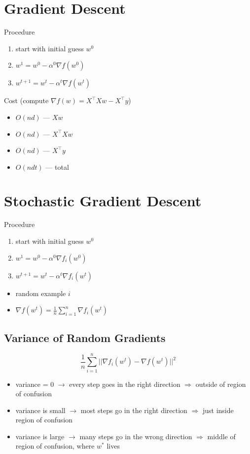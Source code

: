 \documentclass[10pt,landscape,a4paper]{article}
\begin{document}
\begin{multicols*}{5}
\section{Gradient Descent}
Procedure
\begin{enumerate}
    \item start with initial guess \(w^0\)
    \item \(w^1 = w^0 - \alpha^0 \nabla f(w^0)\)
    \item \(w^{t+1} = w^t - \alpha^t \nabla f(w^t)\)
\end{enumerate}
Cost (compute \(\nabla f(w) = X^\intercal Xw - X^\intercal y\))
\begin{itemize}
    \item \(O(nd)\) --- \(Xw\)
    \item \(O(nd)\) --- \(X^\intercal Xw\)
    \item \(O(nd)\) --- \(X^\intercal y\)
    \item \(O(ndt)\) --- total
\end{itemize}

\section{Stochastic Gradient Descent}
Procedure
\begin{enumerate}
    \item start with initial guess \(w^0\)
    \item \(w^1  = w^0 - \alpha^0 \nabla f_i(w^0)\)
    \item \(w^{t+1} = w^t - \alpha^t \nabla f_i(w^t)\)
\end{enumerate}
\begin{itemize}
    \item random example \(i\)
    \item \(\nabla f(w^t) = \frac{1}{n} \sum_{i=1}^{n} \nabla f_i(w^t)\)
\end{itemize}

\subsection{Variance of Random Gradients}
\begin{dmath*}
    \frac{1}{n} \sum_{i=1}^{n} ||\nabla f_i(w^t) - \nabla f(w^t)||^2
\end{dmath*}
\begin{itemize}
    \item variance = 0 \(\rightarrow \) every step goes in the right direction \(\Rightarrow \)  outside of region of confusion
    \item variance is small \(\rightarrow \) most steps go in the right direction \(\Rightarrow \)  just inside region of confusion
    \item variance is large \(\rightarrow \) many steps go in the wrong direction \(\Rightarrow \) middle of region of confusion, where \(w^*\) lives
\end{itemize}


\end{multicols*}
\end{document}
